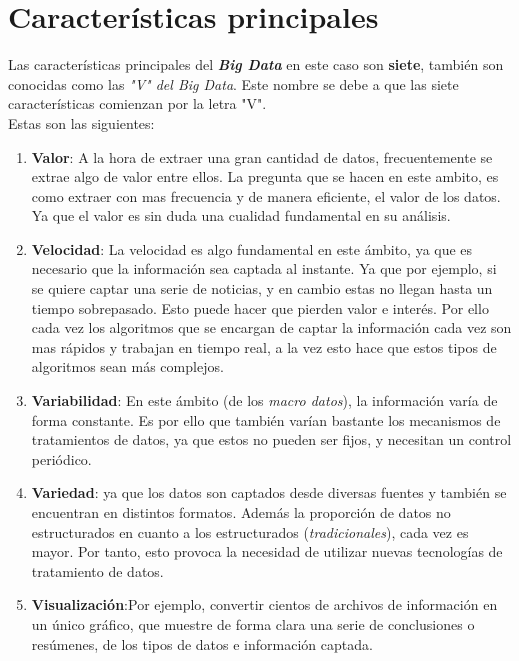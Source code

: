 \documentclass[11pt]{diazessay} %
\begin{document}
\newpage
\section*{Características principales}
Las características principales del \textit{\textbf{Big Data}} en este caso son \textbf{siete}, también son conocidas como las \textit{"V" del Big Data}. Este nombre se debe a que las siete características comienzan por la letra "V".\\ 
Estas son las siguientes:

\begin{enumerate}
	\item \textbf{Valor}: A la hora de extraer una gran cantidad de datos, frecuentemente se extrae algo de valor entre ellos. La pregunta que se hacen en este ambito, es como extraer con mas frecuencia y de manera eficiente, el valor de los datos. Ya que el valor es sin duda una cualidad fundamental en su análisis.
	
	\item \textbf{Velocidad}: La velocidad es algo fundamental en este ámbito, ya que es necesario que la información sea captada al instante. Ya que por ejemplo, si se quiere captar una serie de noticias, y en cambio estas no llegan hasta un tiempo sobrepasado. Esto puede hacer que pierden valor e interés. Por ello cada vez los algoritmos que se encargan de captar la información cada vez son mas rápidos y trabajan en tiempo real, a la vez esto hace que estos tipos de algoritmos sean más complejos.
	
	\item \textbf{Variabilidad}: En este ámbito (de los \textit{macro datos}), la información varía de forma constante. Es por ello que también varían bastante los mecanismos de tratamientos de datos, ya que estos no pueden ser fijos, y necesitan un control periódico.
	
	\item \textbf{Variedad}: ya que los datos son captados desde diversas fuentes y también se encuentran en distintos formatos. Además la proporción de datos no estructurados en cuanto a los estructurados (\textit{tradicionales}), cada vez es mayor. Por tanto, esto provoca la necesidad de utilizar nuevas tecnologías de tratamiento de datos.
	
	\item \textbf{Visualización}:Por ejemplo, convertir cientos de archivos de información en un único gráfico, que muestre de forma clara una serie de conclusiones o resúmenes, de los tipos de datos e información captada.
	

\end{enumerate}
\end{document}
